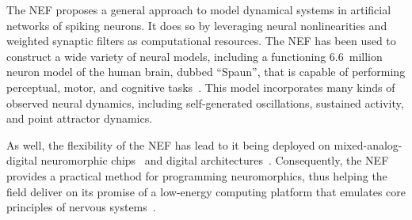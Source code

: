The NEF proposes a general approach to model dynamical systems in artificial networks of spiking neurons.
It does so by leveraging neural nonlinearities and weighted synaptic filters as computational resources.
The NEF has been used to construct a wide variety of neural models, including a functioning 6.6~million neuron model of the human brain, dubbed ``Spaun'', that is capable of performing perceptual, motor, and cognitive tasks~\citep{eliasmith2012, choo2018}.
This model incorporates many kinds of observed neural dynamics, including self-generated oscillations, sustained activity, and point attractor dynamics.

As well, the flexibility of the NEF has lead to it being deployed on mixed-analog-digital neuromorphic chips~\citep{choudhary2012silicon, corradi2014, voelker2017iscas, voelker2017neuromorphic, braindrop2019} and digital architectures~\citep{bekolay2014, wang2014compact, mundy2015, knight2016, berzish2016, wang2017neuromorphic, blouw2018a, fischl2018}.
Consequently, the NEF provides a practical method for programming neuromorphics, thus helping the field deliver on its promise of a low-energy computing platform that emulates core principles of nervous systems~\citep{boahen2017neuromorph}.

